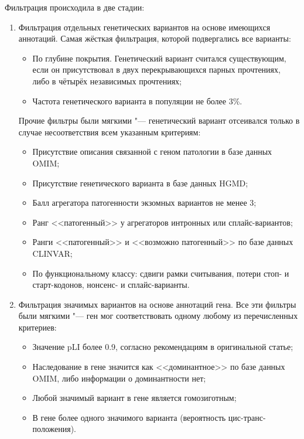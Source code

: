 \documentclass[a4paper,12pt]{article}
\begin{document}
Фильтрация происходила в две стадии:
\begin{enumerate}
\item Фильтрация отдельных генетических вариантов на основе имеющихся аннотаций.
Самая жёсткая фильтрация, которой подвергались все варианты:
\begin{itemize}
\item По глубине покрытия.
Генетический вариант считался существующим, если он присутствовал в двух перекрывающихся парных прочтениях, либо в чётырёх независимых прочтениях;
\item Частота генетического варианта в популяции не более 3\%\cite{ryzhkova}.
\end{itemize}

Прочие фильтры были мягкими "--- генетический вариант отсеивался только в случае несоответствия всем указанным критериям:

\begin{itemize}
\item Присутствие описания связанной с геном патологии в базе данных OMIM;
\item Присутствие генетического варианта в базе данных HGMD;
\item Балл агрегатора патогенности экзомных вариантов не менее 3\cite{ryzhkova};
\item Ранг <<патогенный>> у агрегаторов интронных или сплайс-вариантов;
\item Ранги <<патогенный>> и <<возможно патогенный>> по базе данных CLINVAR;
\item По функциональному классу: сдвиги рамки считывания, потери стоп- и старт-кодонов, нонсенс- и сплайс-варианты.
\end{itemize}

\item Фильтрация значимых вариантов на основе аннотаций гена.
Все эти фильтры были мягкими "--- ген мог соответствовать одному любому из перечисленных критериев:

\begin{itemize}
\item Значение pLI более 0.9, согласно рекомендациям в оригинальной статье\cite{lek};
\item Наследование в гене значится как <<доминантное>> по базе данных OMIM, либо информации о доминантности нет;
\item Любой значимый вариант в гене является гомозиготным;
\item В гене более одного значимого варианта (вероятность цис-транс-положения).
\end{itemize}
\end{enumerate}
\end{document}
